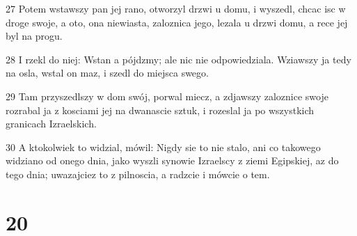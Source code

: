 \par 27 Potem wstawszy pan jej rano, otworzyl drzwi u domu, i wyszedl, chcac isc w droge swoje, a oto, ona niewiasta, zaloznica jego, lezala u drzwi domu, a rece jej byl na progu.
\par 28 I rzekl do niej: Wstan a pójdzmy; ale nic nie odpowiedziala. Wziawszy ja tedy na osla, wstal on maz, i szedl do miejsca swego.
\par 29 Tam przyszedlszy w dom swój, porwal miecz, a zdjawszy zaloznice swoje rozrabal ja z kosciami jej na dwanascie sztuk, i rozeslal ja po wszystkich granicach Izraelskich.
\par 30 A ktokolwiek to widzial, mówil: Nigdy sie to nie stalo, ani co takowego widziano od onego dnia, jako wyszli synowie Izraelscy z ziemi Egipskiej, az do tego dnia; uwazajciez to z pilnoscia, a radzcie i mówcie o tem.

\chapter{20}

